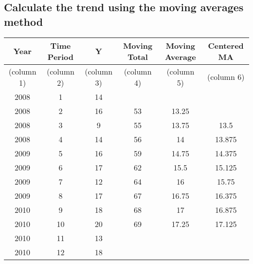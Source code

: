 \documentclass[a4paper,12pt]{article}
\begin{document}
\subsection*{Calculate the trend using the moving averages method}
\begin{center}
\begin{tabular}{|c|c|c|c|c|c|}
\hline
Year	&	Time Period	&	Y	&	Moving Total	&	Moving Average	&	Centered MA	\\	\hline
(column 1)	&	(column 2)	&	(column 3)	&	(column 4)	&	(column 5)	&	(column 6)	\\	\hline
2008	&	1	&	14	&		&		&		\\	\hline
2008	&	2	&	16	&	53	&	13.25	&		\\	\hline
2008	&	3	&	9	&	55	&	13.75	&	13.5	\\	\hline
2008	&	4	&	14	&	56	&	14	&	13.875	\\	\hline
2009	&	5	&	16	&	59	&	14.75	&	14.375	\\	\hline
2009	&	6	&	17	&	62	&	15.5	&	15.125	\\	\hline
2009	&	7	&	12	&	64	&	16	&	15.75	\\	\hline
2009	&	8	&	17	&	67	&	16.75	&	16.375	\\	\hline
2010	&	9	&	18	&	68	&	17	&	16.875	\\	\hline
2010	&	10	&	20	&	69	&	17.25	&	17.125	\\	\hline
2010	&	11	&	13	&		&		&		\\	\hline
2010	&	12	&	18	&		&		&		\\	\hline
\end{tabular} 
\end{center}
\end{document}
